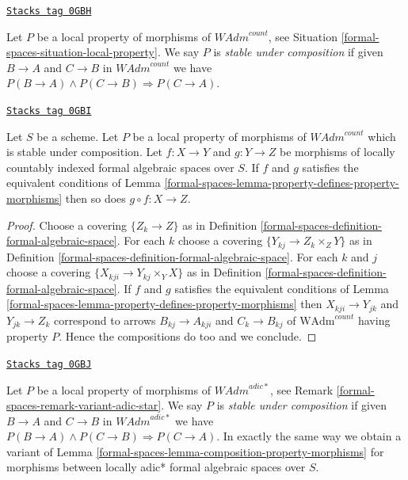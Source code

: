 \begin{definition}
\label{formal-spaces-situation-composition-local-property}
\href{https://stacks.math.columbia.edu/tag/0GBH}{\texttt{Stacks tag 0GBH}}

Let $P$ be a local property of morphisms of $\textit{WAdm}^{count}$, see
Situation \ref{formal-spaces-situation-local-property}. We say $P$ is {\it stable under
composition} if given $B \to A$ and $C \to B$ in $\textit{WAdm}^{count}$
we have $P(B \to A) \wedge P(C \to B) \Rightarrow P(C \to A)$.
\end{definition}

\begin{lemma}
\label{formal-spaces-lemma-composition-property-morphisms}
\href{https://stacks.math.columbia.edu/tag/0GBI}{\texttt{Stacks tag 0GBI}}

Let $S$ be a scheme. Let $P$ be a local property of morphisms of
$\textit{WAdm}^{count}$ which is stable under composition.
Let $f : X \to Y$ and $g : Y \to Z$ be morphisms of locally countably indexed
formal algebraic spaces over $S$. If $f$ and $g$
satisfies the equivalent conditions of
Lemma \ref{formal-spaces-lemma-property-defines-property-morphisms}
then so does $g \circ f : X \to Z$.
\end{lemma}

\begin{proof}
Choose a covering $\{Z_k \to Z\}$ as in
Definition \ref{formal-spaces-definition-formal-algebraic-space}.
For each $k$ choose a covering $\{Y_{kj} \to Z_k \times_Z Y\}$
as in Definition \ref{formal-spaces-definition-formal-algebraic-space}.
For each $k$ and $j$ choose a covering $\{X_{kji} \to Y_{kj} \times_Y X\}$
as in Definition \ref{formal-spaces-definition-formal-algebraic-space}.
If $f$ and $g$
satisfies the equivalent conditions of
Lemma \ref{formal-spaces-lemma-property-defines-property-morphisms}
then $X_{kji} \to Y_{jk}$ and $Y_{jk} \to Z_k$
correspond to arrows
$B_{kj} \to A_{kji}$ and $C_k \to B_{kj}$ of
$\text{WAdm}^{count}$ having property $P$.
Hence the compositions do too and we conclude.
\end{proof}

\begin{remark}

\label{formal-spaces-remark-composition-variant-adic-star}
\href{https://stacks.math.columbia.edu/tag/0GBJ}{\texttt{Stacks tag 0GBJ}}

Let $P$ be a local property of morphisms of $\textit{WAdm}^{adic*}$, see
Remark \ref{formal-spaces-remark-variant-adic-star}. We say $P$ is {\it stable under
composition} if given $B \to A$ and $C \to B$ in $\textit{WAdm}^{adic*}$
we have $P(B \to A) \wedge P(C \to B) \Rightarrow P(C \to A)$.
In exactly the same way we obtain a variant of
Lemma \ref{formal-spaces-lemma-composition-property-morphisms}
for morphisms between locally adic* formal algebraic spaces over $S$.
\end{remark}

